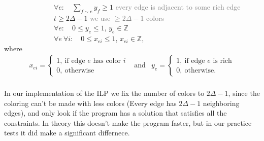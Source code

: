 \documentclass[12pt,a4paper]{amsart}
\theoremstyle{definition} %
\theoremstyle{plain} %
\newcommand{\Z}{\mathbb Z}
\begin{document}
        \ \ \ \ \ \ \ \ \ \ \ \ \ \ $\forall e: \quad \sum_{f \sim e}y_f \geq 1$ \hfill \textcolor{gray}{every edge is adjacent to some rich edge}\\

        \ \ \ \ \ \ \ \ \ \ \ \ \ \ $t \geq 2 \Delta - 1$ \hfill \textcolor{gray}{we use $\geq 2 \Delta - 1$ colors}\\

        \ \ \ \ \ \ \ \ \ \ \ \ \ \ $\forall e: \quad 0 \leq y_{e} \leq 1$, $y_{e} \in \Z$\\

        \ \ \ \ \ \ \ \ \ \ \ \ \ \ $\forall e \ \forall i: \quad 0 \leq x_{ei} \leq 1$, $x_{ei} \in \Z$,\\

        where
        \begin{align*}        x_{ei} = \begin{cases}
                    1, \  \text{if edge $e$ has color $i$} \\
                    0, \  \text{otherwise}
            \end{cases} & \text{and} & 
            y_{e} = \begin{cases}
                1, \  \text{if edge $e$ is rich} \\
                0, \  \text{otherwise.}
            \end{cases}
        \end{align*}\\

        In our implementation of the ILP we fix the number of colors to $2 \Delta - 1$, since the coloring can't be made with less colors (Every edge has $2 \Delta - 1$ neighboring edges), and only look if the program has a solution that satisfies all the constraints. In theory this doesn't make the program faster, but in our practice tests it did make a significant differnece.\\
\end{document}
